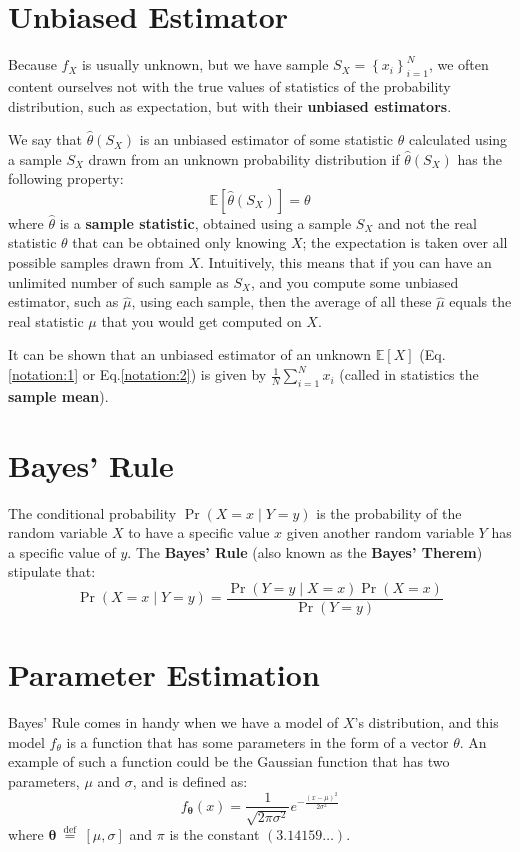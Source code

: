 \section{Unbiased Estimator}
Because \(f_{X}\) is usually unknown, but we have sample \(S_{X}=\left\{x_{i}\right\}_{i=1}^{N}\), we often content ourselves not with the true values of statistics of the probability distribution, such as expectation, but with their \textbf{unbiased estimators}.

We say that \(\hat{\theta}\left(S_{X}\right)\) is an unbiased estimator of some statistic \(\theta\) calculated using a sample \(S_{X}\)
drawn from an unknown probability distribution if \(\hat{\theta}\left(S_{X}\right)\) has the following property:
$$
	\mathbb{E}\left[\hat{\theta}\left(S_{X}\right)\right]=\theta
$$
where \(\hat{\theta}\) is a \textbf{sample statistic}, obtained using a sample \(S_{X}\) and not the real statistic \(\theta\) that can be obtained only knowing \(X\); the expectation is taken over all possible samples drawn from \(X\). Intuitively, this means that if you can have an unlimited number of such sample as \(S_{X}\), and you compute some unbiased estimator, such as \(\hat{\mu}\), using each sample, then the average of all these \(\hat{\mu}\) equals the real statistic \(\mu\) that you would get computed on \(X\).

It can be shown that an unbiased estimator of an unknown \(\mathbb{E}[X]\) (Eq.\ref{notation:1} or Eq.\ref{notation:2}) is given by \(\frac{1}{N} \sum_{i=1}^{N} x_{i}\) (called in statistics the \textbf{sample mean}).

\section{Bayes' Rule}
The conditional probability \(\operatorname{Pr}(X=x \mid Y=y)\) is the probability of the random variable \(X\) to have a specific value $x$ given another random variable $Y$ has a specific value of $y$. The \textbf{Bayes' Rule} (also known as the \textbf{Bayes' Therem}) stipulate that:
$$
	\operatorname{Pr}(X=x \mid Y=y)=\frac{\operatorname{Pr}(Y=y \mid X=x) \operatorname{Pr}(X=x)}{\operatorname{Pr}(Y=y)}
$$

\section{Parameter Estimation}
Bayes' Rule comes in handy when we have a model of \(X\)'s distribution, and this model \(f_{\theta}\) is a function that has some parameters in the form of a vector \(\theta\).  An example of such a function could be the Gaussian function that has two parameters, $\mu$ and $\sigma$, and is defined as:
\begin{equation}
	f_{\boldsymbol{\theta}}(x)=\frac{1}{\sqrt{2 \pi \sigma^{2}}} e^{-\frac{(x-\mu)^{2}}{2 \sigma^{2}}}
	\label{notation:3}
\end{equation}
where \(\boldsymbol{\theta} \stackrel{\text { def }}{=}[\mu, \sigma]\) and \(\pi\) is the constant \((3.14159 \ldots)\).

